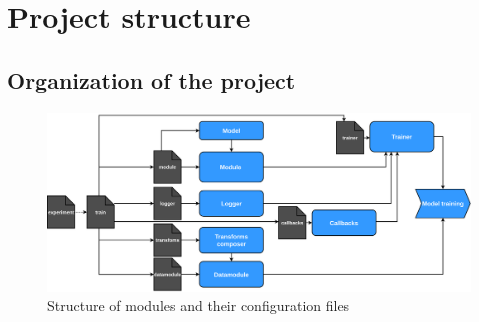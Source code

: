 \chapter{Project structure}
\label{chapter:project_structure}

\section{Organization of the project}

\begin{figure}
    \centering
    \includegraphics[width=\linewidth]{images/Module.drawio.pdf}
    \caption{Structure of modules and their configuration files}
    \label{fig:structure_modules}
\end{figure}

